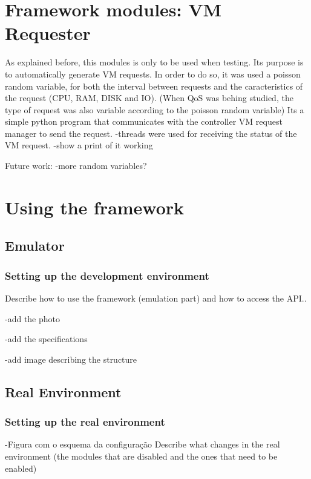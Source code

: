 \documentclass[12pt,english,oneside]{book}
\begin{document}
\newpage

\section{Framework modules: VM Requester}

As explained before, this modules is only to be used when testing.
Its purpose is to automatically generate VM requests.
In order to do so, it was used a poisson random variable, for both the interval between requests and the caracteristics of the request (CPU, RAM, DISK and IO). (When QoS was behing studied, the type of request was also variable according to the poisson random variable)
Its a simple python program that communicates with the controller VM request manager to send the request.
-threads were used for receiving the status of the VM request.
-show a print of it working

Future work:
-more random variables?

\newpage

\section{Using the framework}

\subsection{Emulator}

\subsubsection{Setting up the development environment}

Describe how to use the framework (emulation part) and how to access the API..

-add the photo

-add the specifications

-add image describing the structure

\subsection{Real Environment}

\subsubsection{Setting up the real environment}

-Figura com o esquema da configuração
Describe what changes in the real environment (the modules that are disabled and the ones that need to be enabled)
\end{document}

